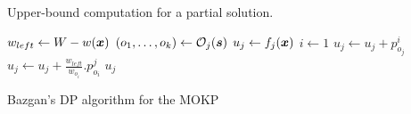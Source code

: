 \begin{algorithm}
  \caption{Upper-bound computation for a partial solution.}
  \label{alg:ub}
  \begin{algorithmic}[1]
      \State $w_{left} \gets W - w(\boldsymbol{x})$
      \State $(o_1, \ldots, o_k) \gets \mathcal{O}_{j}(\boldsymbol{s})$
      \State $u_j \gets f_j(\boldsymbol{x})$
      \State $i \gets 1$
        \State $u_j \gets u_j + p^i_{o_j}$
      \EndWhile
        \State $u_j \gets u_j + \frac{w_{left}}{w_{o_i}}.p^j_{o_i}$
      \EndIf
      \State \Return $u_j$
    \EndFunction
  \end{algorithmic}
\end{algorithm}


\begin{algorithm}
  \caption{Bazgan's DP algorithm for the MOKP}
  \label{alg:bazgan}
  
\end{algorithm}


